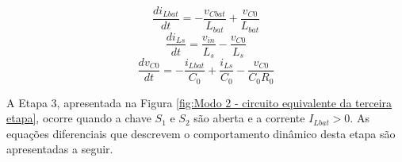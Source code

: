 \begin{equation}
    \frac{d i_{Lbat}}{d t } =-\frac{v_{Cbat}}{L_{bat}} + \frac{v_{C0}}{L_{bat}}
    \label{ModoIe2ilbat}
\end{equation}
\begin{equation}
    \frac{d i_{Ls}}{d t } = \frac{v_{in}}{L_s} -\frac{v_{C0}}{L_{s}}  
    \label{ModoIe2ils}
\end{equation}
\begin{equation}
    \frac{d v_{C0}}{d t } = -\frac{i_{Lbat}}{C_0} + \frac{i_{Ls}}{C_0}  -\frac {v_{C0}}{C_{0}R_{0}} 
    \label{ModoIe2Vc0}
\end{equation}


A Etapa 3, apresentada na Figura \ref{fig:Modo 2 - circuito equivalente da terceira etapa}, ocorre quando a chave $S_1$ e $S_2$ são aberta e a corrente $I_{Lbat}>0$. As equações diferenciais que descrevem o comportamento dinâmico desta etapa são apresentadas a seguir.


    

